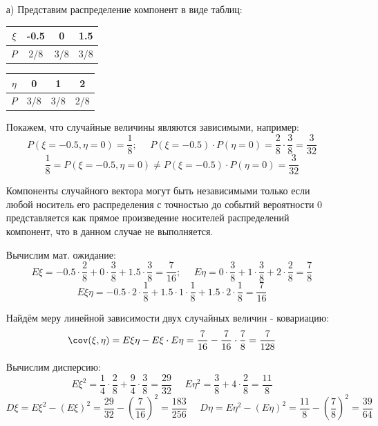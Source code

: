 \begin{enumerate}
	\item[а)]
	Представим распределение компонент в виде таблиц:
	\begin{table}[H]
		\centering
		\begin{tabular}{|c|c|c|c|}
			\hline
			$\xi$ & -0.5 & 0   & 1.5 \\ \hline
			$P$   & 2/8  & 3/8 & 3/8 \\ \hline
		\end{tabular}
	\end{table}
	\begin{table}[H]
		\centering
		\begin{tabular}{|c|c|c|c|}
			\hline
			$\eta$ & 0   & 1   & 2   \\ \hline
			$P$    & 3/8 & 3/8 & 2/8 \\ \hline
		\end{tabular}
	\end{table}
	
	Покажем, что случайные величины являются зависимыми, например:
	\[ P(\xi = -0.5, \eta = 0) = \frac{1}{8}; ~~~~~~ P(\xi = -0.5) \cdot P(\eta = 0) = \frac{2}{8} \cdot \frac{3}{8} = \frac{3}{32} \]
	\[ \frac{1}{8} = P(\xi = -0.5, \eta = 0) \ne P(\xi = -0.5) \cdot P(\eta = 0) = \frac{3}{32} \]
	
	Компоненты случайного вектора могут быть независимыми только если любой носитель его распределения с точностью до событий вероятности 0 представляется как прямое произведение носителей распределений компонент, что в данном случае не выполняется.
	
	Вычислим мат. ожидание:
	\[
	E\xi = -0.5 \cdot \frac{2}{8} + 0 \cdot \frac{3}{8} + 1.5 \cdot \frac{3}{8} = \frac{7}{16};
	~~~~~~
	E\eta = 0 \cdot \frac{3}{8} + 1 \cdot \frac{3}{8} + 2 \cdot \frac{2}{8} = \frac{7}{8}
	\]
	\[ E\xi\eta = -0.5 \cdot 2 \cdot \frac{1}{8} + 1.5 \cdot 1 \cdot \frac{1}{8} + 1.5 \cdot 2 \cdot \frac{1}{8} = \frac{7}{16} \]
	
	Найдём меру линейной зависимости двух случайных величин - ковариацию:
	\[ \cov (\xi, \eta) = E\xi\eta - E\xi \cdot E\eta = \frac{7}{16} - \frac{7}{16} \cdot \frac{7}{8} = \frac{7}{128} \]
	
	Вычислим дисперсию:
	\[
	E\xi^2 = \frac{1}{4} \cdot \frac{2}{8} + \frac{9}{4} \cdot \frac{3}{8} = \frac{29}{32}
	~~~~~~
	E\eta^2 = \frac{3}{8} + 4 \cdot \frac{2}{8} = \frac{11}{8}
	\]
	\[
	D\xi = E\xi^2 - (E\xi)^2 = \frac{29}{32} - \left( \frac{7}{16} \right)^2 = \frac{183}{256}
	~~~~~~
	D\eta = E\eta^2 - (E\eta)^2 = \frac{11}{8} - \left( \frac{7}{8} \right)^2 =\frac{39}{64}
	\]
	

\end{enumerate}
